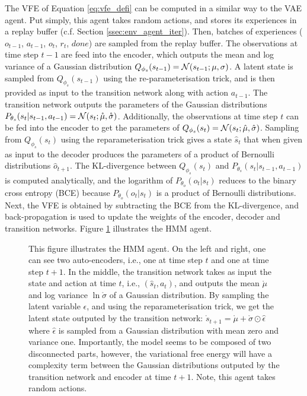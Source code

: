 \documentclass[twoside,11pt]{article}
\let\oldmathcal\mathcal
\renewcommand{\mathcal}[1]{%
  \IfSubStr{ABCDEFGHIJKLMNOPQRSTUVWXYZ}{#1}{\oldmathcal{#1}}{\mathdutchcal{#1}}
}
\begin{document}
The VFE of Equation \ref{eq:vfe_defi} can be computed in a similar way to the VAE agent. Put simply, this agent takes random actions, and stores its experiences in a replay buffer (c.f. Section \ref{ssec:env_agent_iter}). Then, batches of experiences ($o_{t-1}$, $a_{t-1}$, $o_t$, $r_t$, $done$) are sampled from the replay buffer. The observations at time step $t - 1$ are feed into the encoder, which outputs the mean and log variance of a Gaussian distribution $Q_{\phi_s}(s_{t-1}) = \mathcal{N}(s_{t-1};\mu, \sigma)$. A latent state is sampled from $Q_{\phi_s}(s_{t-1})$ using the re-parameterisation trick, and is then provided as input to the transition network along with action $a_{t-1}$. The transition network outputs the parameters of the Gaussian distributions $P_{\theta_s}(s_t|s_{t-1},a_{t-1}) = \mathcal{N}(s_t;\mathring{\mu}, \mathring{\sigma})$. Additionally, the observations at time step $t$ can be fed into the encoder to get the parameters of $Q_{\phi_s}(s_t) = \mathcal{N}(s_t;\hat{\mu}, \hat{\sigma})$. Sampling from $Q_{\phi_s}(s_t)$ using the reparameterisation trick gives a state $\hat{s}_t$ that when given as input to the decoder produces the parameters of a product of Bernoulli distributions $\hat{o}_{t+1}$. The KL-divergence between $Q_{\phi_s}(s_t)$ and $P_{\theta_s}(s_t|s_{t-1},a_{t-1})$ is computed analytically, and the logarithm of $P_{\theta_o}(o_t|s_t)$ reduces to the binary cross entropy (BCE) because $P_{\theta_o}(o_t|s_t)$ is a product of Bernoulli distributions. Next, the VFE is obtained by subtracting the BCE from the KL-divergence, and back-propagation is used to update the weights of the encoder, decoder and transition networks. Figure \ref{fig:HMM} illustrates the HMM agent. 

\begin{figure}[h]
	\begin{center}
	\end{center}
	\caption{This figure illustrates the HMM agent. On the left and right, one can see two auto-encoders, i.e., one at time step $t$ and one at time step $t+1$. In the middle, the transition network takes as input the state and action at time $t$, i.e., $(\hat{s}_t, a_t)$, and outputs the mean $\mathring{\mu}$ and log variance $\ln\mathring{\sigma}$ of a Gaussian distribution. By sampling the latent variable $\epsilon$, and using the reparameterisation trick, we get the latent state outputed by the transition network: $\mathring{s}_{t+1} = \mathring{\mu} + \mathring{\sigma} \odot \hat{\epsilon}$ where $\hat{\epsilon}$ is sampled from a Gaussian distribution with mean zero and variance one. Importantly, the model seems to be composed of two disconnected parts, however, the variational free energy will have a complexity term between the Gaussian distributions outputed by the transition network and encoder at time $t+1$. Note, this agent takes random actions.}
   \label{fig:HMM}
\end{figure}
\end{document}
